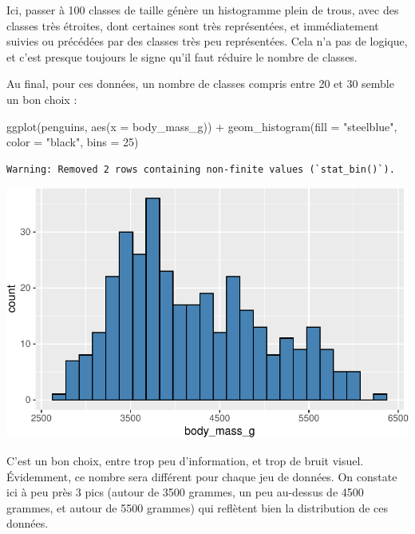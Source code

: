 \documentclass[
  a4paper,
  DIV=11,
  numbers=noendperiod,
  oneside]{scrreprt}
\newenvironment{Shaded}{}{}
\newcommand{\AttributeTok}[1]{\textcolor[rgb]{0.84,0.23,0.29}{#1}}
\newcommand{\DecValTok}[1]{\textcolor[rgb]{0.00,0.36,0.77}{#1}}
\newcommand{\FunctionTok}[1]{\textcolor[rgb]{0.44,0.26,0.76}{#1}}
\newcommand{\NormalTok}[1]{\textcolor[rgb]{0.14,0.16,0.18}{#1}}
\newcommand{\SpecialCharTok}[1]{\textcolor[rgb]{0.00,0.36,0.77}{#1}}
\newcommand{\StringTok}[1]{\textcolor[rgb]{0.01,0.18,0.38}{#1}}
\begin{document}
Ici, passer à 100 classes de taille génère un histogramme plein de
trous, avec des classes très étroites, dont certaines sont très
représentées, et immédiatement suivies ou précédées par des classes très
peu représentées. Cela n'a pas de logique, et c'est presque toujours le
signe qu'il faut réduire le nombre de classes.

Au final, pour ces données, un nombre de classes compris entre 20 et 30
semble un bon choix :

\begin{Shaded}
\begin{Highlighting}[]
\FunctionTok{ggplot}\NormalTok{(penguins, }\FunctionTok{aes}\NormalTok{(}\AttributeTok{x =}\NormalTok{ body\_mass\_g)) }\SpecialCharTok{+}
  \FunctionTok{geom\_histogram}\NormalTok{(}\AttributeTok{fill =} \StringTok{"steelblue"}\NormalTok{, }\AttributeTok{color =} \StringTok{"black"}\NormalTok{,}
                 \AttributeTok{bins =} \DecValTok{25}\NormalTok{)}
\end{Highlighting}
\end{Shaded}

\begin{verbatim}
Warning: Removed 2 rows containing non-finite values (`stat_bin()`).
\end{verbatim}

\includegraphics{03-visualization_files/figure-pdf/unnamed-chunk-15-1.pdf}

C'est un bon choix, entre trop peu d'information, et trop de bruit
visuel. Évidemment, ce nombre sera différent pour chaque jeu de données.
On constate ici à peu près 3 pics (autour de 3500 grammes, un peu
au-dessus de 4500 grammes, et autour de 5500 grammes) qui reflètent bien
la distribution de ces données.
\end{document}
